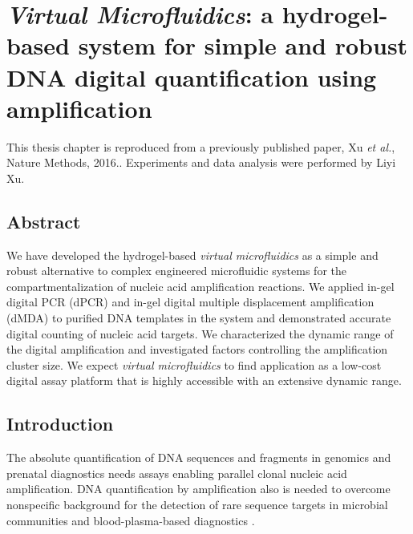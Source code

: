 \chapter{\textbf{\textit{Virtual Microfluidics}}: a hydrogel-based system for simple and robust DNA digital quantification using amplification}
This thesis chapter is reproduced from a previously published paper, Xu \textit{et al.}, Nature Methods, 2016.\cite{Xu:2016wt}. Experiments and data analysis were performed by Liyi Xu. 

\section{Abstract}
We have developed the hydrogel-based \textit{virtual microfluidics} as a simple and robust alternative to complex engineered microfluidic systems for the compartmentalization of nucleic acid amplification reactions. We applied in-gel digital PCR (dPCR) and in-gel digital multiple displacement amplification (dMDA) to purified DNA templates in the system and demonstrated accurate digital counting of nucleic acid targets. We characterized the dynamic range of the digital amplification and investigated factors controlling the amplification cluster size. We expect \textit{virtual microfluidics} to find application as a low-cost digital assay platform that is highly accessible with an extensive dynamic range. 

\section{Introduction}

The absolute quantification of DNA sequences and fragments in genomics \cite{Blainey:2011dt} and prenatal diagnostics \cite{Lo:2007hb} needs assays enabling parallel clonal nucleic acid amplification. DNA quantification by amplification also is needed to overcome nonspecific background for the detection of rare sequence targets in microbial communities and blood-plasma-based diagnostics \cite{Huggett:2015hp,Gevensleben:2013kg,Kuypers:2017it,Johnson:2002wb}.


